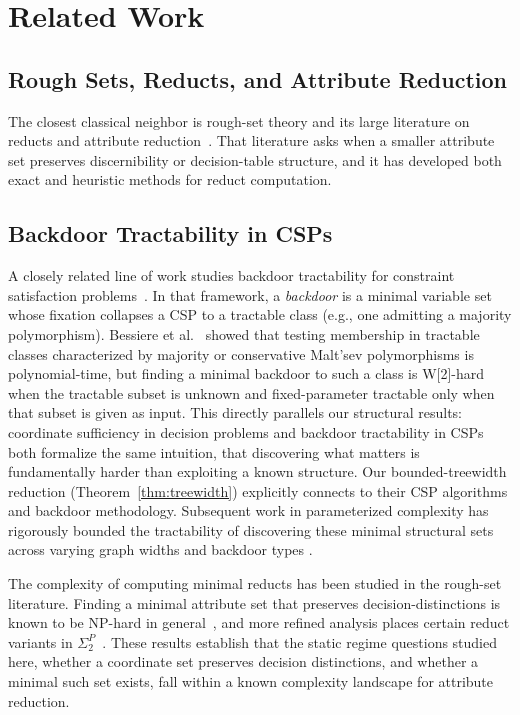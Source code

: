 \section{Related Work}\label{sec:related}

\subsection{Rough Sets, Reducts, and Attribute Reduction}
 
The closest classical neighbor is rough-set theory and its large literature on reducts and attribute reduction~\cite{pawlak1982rough,jensen2004semantics,jensen2008rough}. That literature asks when a smaller attribute set preserves discernibility or decision-table structure, and it has developed both exact and heuristic methods for reduct computation.

\subsection{Backdoor Tractability in CSPs}
A closely related line of work studies backdoor tractability for constraint satisfaction problems~\cite{williams2003backdoors, bessiere2013detecting}. In that framework, a \emph{backdoor} is a minimal variable set whose fixation collapses a CSP to a tractable class (e.g., one admitting a majority polymorphism). Bessiere et al.~\cite{bessiere2013detecting} showed that testing membership in tractable classes characterized by majority or conservative Malt'sev polymorphisms is polynomial-time, but finding a minimal backdoor to such a class is W[2]-hard when the tractable subset is unknown and fixed-parameter tractable only when that subset is given as input. This directly parallels our structural results: coordinate sufficiency in decision problems and backdoor tractability in CSPs both formalize the same intuition, that discovering what matters is fundamentally harder than exploiting a known structure. Our bounded-treewidth reduction (Theorem~\ref{thm:treewidth}) explicitly connects to their CSP algorithms and backdoor methodology. Subsequent work in parameterized complexity has rigorously bounded the tractability of discovering these minimal structural sets across varying graph widths and backdoor types \cite{ganian2017discovering}.

The complexity of computing minimal reducts has been studied in the rough-set literature. Finding a minimal attribute set that preserves decision-distinctions is known to be NP-hard in general~\cite{slowinski1995decision}, and more refined analysis places certain reduct variants in $\Sigma_2^P$~\cite{multiplier}. These results establish that the static regime questions studied here, whether a coordinate set preserves decision distinctions, and whether a minimal such set exists, fall within a known complexity landscape for attribute reduction.

